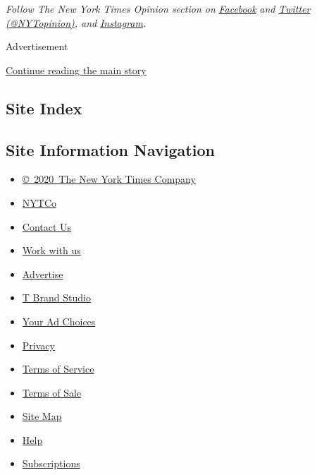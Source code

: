 \emph{Follow The New York Times Opinion section on}
\href{https://www.facebook.com/nytopinion}{\emph{Facebook}} \emph{and}
\href{http://twitter.com/NYTOpinion}{\emph{Twitter
(@NYTopinion)}}\emph{, and}
\href{https://www.instagram.com/nytopinion/}{\emph{Instagram}}\emph{.}

Advertisement

\protect\hyperlink{after-bottom}{Continue reading the main story}

\hypertarget{site-index}{%
\subsection{Site Index}\label{site-index}}

\hypertarget{site-information-navigation}{%
\subsection{Site Information
Navigation}\label{site-information-navigation}}

\begin{itemize}
\tightlist
\item
  \href{https://help.nytimes.com/hc/en-us/articles/115014792127-Copyright-notice}{©~2020~The
  New York Times Company}
\end{itemize}

\begin{itemize}
\tightlist
\item
  \href{https://www.nytco.com/}{NYTCo}
\item
  \href{https://help.nytimes.com/hc/en-us/articles/115015385887-Contact-Us}{Contact
  Us}
\item
  \href{https://www.nytco.com/careers/}{Work with us}
\item
  \href{https://nytmediakit.com/}{Advertise}
\item
  \href{http://www.tbrandstudio.com/}{T Brand Studio}
\item
  \href{https://www.nytimes.com/privacy/cookie-policy\#how-do-i-manage-trackers}{Your
  Ad Choices}
\item
  \href{https://www.nytimes.com/privacy}{Privacy}
\item
  \href{https://help.nytimes.com/hc/en-us/articles/115014893428-Terms-of-service}{Terms
  of Service}
\item
  \href{https://help.nytimes.com/hc/en-us/articles/115014893968-Terms-of-sale}{Terms
  of Sale}
\item
  \href{https://spiderbites.nytimes.com}{Site Map}
\item
  \href{https://help.nytimes.com/hc/en-us}{Help}
\item
  \href{https://www.nytimes.com/subscription?campaignId=37WXW}{Subscriptions}
\end{itemize}
